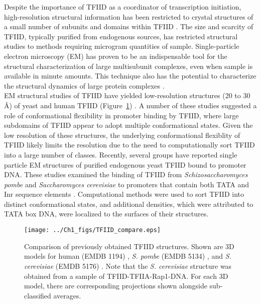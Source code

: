 Despite the importance of TFIID as a coordinator of transcription initiation, high-resolution structural information has been restricted to crystal structures of a small number of subunits and domains within TFIID \cite{Bhattacharya_1103,Jacobson_2160,Kim_3377,Kim_3416,Liu_2574,Werten_1763,Xie_2805}. The size and scarcity of TFIID, typically purified from endogenous sources, has restricted structural studies to methods requiring microgram quantities of sample. Single-particle electron microscopy (EM) has proven to be an indispensable tool for the structural characterization of large multisubunit complexes, even when sample is available in minute amounts. This technique also has the potential to characterize the structural dynamics of large protein complexes \cite{Leschziner_883}.\\
\indent EM structural studies of TFIID have yielded low-resolution structures (20 to 30 Å) of yeast and human TFIID (Figure~\ref{fig:Compare}) \cite{Andel_2407,Brand_2375,Elmlund_691,Grob_1281,Leurent_1554,Leurent_1797,Liu_574,Papai_418,Papai_539}. A number of these studies suggested a role of conformational flexibility in promoter binding by TFIID, where large subdomains of TFIID appear to adopt multiple conformational states. Given the low resolution of these structures, the underlying conformational flexiblity of TFIID likely limits the resolution due to the need to computationally sort TFIID into a large number of classes. Recently, several groups have reported single particle EM structures of purified endogenous yeast TFIID bound to promoter DNA. These studies examined the binding of TFIID from \emph{Schizosaccharomyces pombe} and \emph{Saccharomyces cerevisiae} to promoters that contain both TATA and Inr sequence elements \cite{Elmlund_691,Papai_539}. Computational methods were used to sort TFIID into distinct conformational states, and additional densities, which were attributed to TATA box DNA, were localized to the surfaces of their structures.\\
\begin{figure}
\centering
\texttt{[image: ../Ch1\_figs/TFIID\_compare.eps]}
\caption[Comparison of prevoiusly obtained TFIID structures]{Comparison of previously obtained TFIID structures. Shown are 3D models for human (EMDB 1194) \cite{Grob_1281}, \emph{S. pombe} (EMDB 5134) \cite{Elmlund_691}, and \emph{S. cerevisiae} (EMDB 5176) \cite{Papai_539}. Note that the  \emph{S. cerevisiae} structure was obtained from a sample of TFIID-TFIIA-Rap1-DNA. For each 3D model, there are corresponding projections shown alongside sub-classified averages.}
\label{fig:Compare}
\end{figure}
